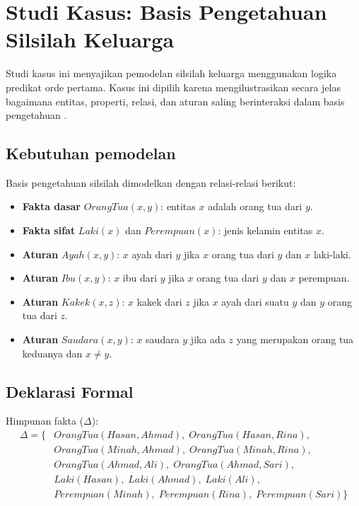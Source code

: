 \section{Studi Kasus: Basis Pengetahuan Silsilah Keluarga}

Studi kasus ini menyajikan pemodelan silsilah keluarga menggunakan logika predikat orde pertama. Kasus ini dipilih karena mengilustrasikan secara jelas bagaimana entitas, properti, relasi, dan aturan saling berinteraksi dalam basis pengetahuan \cite{rosen2019}.

\subsection{Kebutuhan pemodelan}

Basis pengetahuan silsilah dimodelkan dengan relasi-relasi berikut:

\begin{itemize}[leftmargin=*, nosep]
    \item \textbf{Fakta dasar} $OrangTua(x, y)$: entitas $x$ adalah orang tua dari $y$.
    \item \textbf{Fakta sifat} $Laki(x)$ dan $Perempuan(x)$: jenis kelamin entitas $x$.
    \item \textbf{Aturan} $Ayah(x, y)$: $x$ ayah dari $y$ jika $x$ orang tua dari $y$ dan $x$ laki-laki.
    \item \textbf{Aturan} $Ibu(x, y)$: $x$ ibu dari $y$ jika $x$ orang tua dari $y$ dan $x$ perempuan.
    \item \textbf{Aturan} $Kakek(x, z)$: $x$ kakek dari $z$ jika $x$ ayah dari suatu $y$ dan $y$ orang tua dari $z$.
    \item \textbf{Aturan} $Saudara(x, y)$: $x$ saudara $y$ jika ada $z$ yang merupakan orang tua keduanya dan $x \neq y$.
\end{itemize}

\subsection{Deklarasi Formal}

Himpunan fakta ($\Delta$):
\begin{align*}
\Delta = \{ & OrangTua(Hasan, Ahmad), \; OrangTua(Hasan, Rina), \\
            & OrangTua(Minah, Ahmad), \; OrangTua(Minah, Rina), \\
            & OrangTua(Ahmad, Ali), \; OrangTua(Ahmad, Sari), \\
            & Laki(Hasan), \; Laki(Ahmad), \; Laki(Ali), \\
            & Perempuan(Minah), \; Perempuan(Rina), \; Perempuan(Sari) \}
\end{align*}

